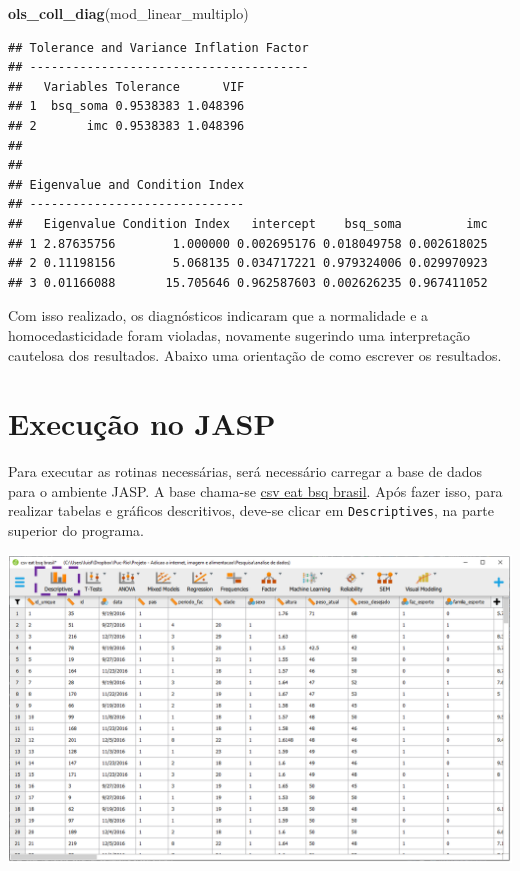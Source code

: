 \documentclass[
]{book}
\newenvironment{Shaded}{\begin{snugshade}}{\end{snugshade}}
\newcommand{\KeywordTok}[1]{\textcolor[rgb]{0.13,0.29,0.53}{\textbf{#1}}}
\newcommand{\NormalTok}[1]{#1}
\begin{document}
\begin{Shaded}
\begin{Highlighting}[]
\KeywordTok{ols_coll_diag}\NormalTok{(mod_linear_multiplo)}
\end{Highlighting}
\end{Shaded}

\begin{verbatim}
## Tolerance and Variance Inflation Factor
## ---------------------------------------
##   Variables Tolerance      VIF
## 1  bsq_soma 0.9538383 1.048396
## 2       imc 0.9538383 1.048396
## 
## 
## Eigenvalue and Condition Index
## ------------------------------
##   Eigenvalue Condition Index   intercept    bsq_soma         imc
## 1 2.87635756        1.000000 0.002695176 0.018049758 0.002618025
## 2 0.11198156        5.068135 0.034717221 0.979324006 0.029970923
## 3 0.01166088       15.705646 0.962587603 0.002626235 0.967411052
\end{verbatim}

Com isso realizado, os diagnósticos indicaram que a normalidade e a homocedasticidade foram violadas, novamente sugerindo uma interpretação cautelosa dos resultados. Abaixo uma orientação de como escrever os resultados.

\hypertarget{execuuxe7uxe3o-no-jasp-15}{%
\section{Execução no JASP}\label{execuuxe7uxe3o-no-jasp-15}}

Para executar as rotinas necessárias, será necessário carregar a base de dados para o ambiente JASP. A base chama-se \href{https://www.dropbox.com/s/l8xkxi5z5fntrd9/csv\%20eat\%20bsq\%20brasil.csv?dl=0}{csv eat bsq brasil}. Após fazer isso, para realizar tabelas e gráficos descritivos, deve-se clicar em \texttt{Descriptives}, na parte superior do programa.

\includegraphics{./img/cap_correlacao_descritivo.png}
\end{document}
